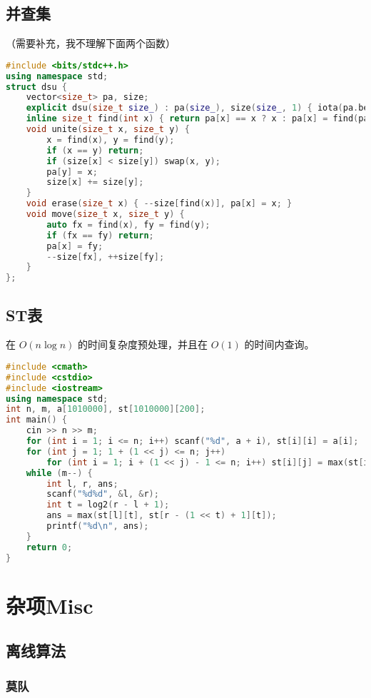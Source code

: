 \documentclass[9pt, a4paper, oneside]{book}
\begin{document}
\section{并查集}
（需要补充，我不理解下面两个函数）
\begin{lstlisting}[language={C++}]
#include <bits/stdc++.h>
using namespace std;
struct dsu {
    vector<size_t> pa, size;
    explicit dsu(size_t size_) : pa(size_), size(size_, 1) { iota(pa.begin(), pa.end(), 0); }
    inline size_t find(int x) { return pa[x] == x ? x : pa[x] = find(pa[x]); }
    void unite(size_t x, size_t y) {
        x = find(x), y = find(y);
        if (x == y) return;
        if (size[x] < size[y]) swap(x, y);
        pa[y] = x;
        size[x] += size[y];
    }
    void erase(size_t x) { --size[find(x)], pa[x] = x; }
    void move(size_t x, size_t y) {
        auto fx = find(x), fy = find(y);
        if (fx == fy) return;
        pa[x] = fy;
        --size[fx], ++size[fy];
    }
};
\end{lstlisting}
\section{ST表}
在 $O(n \log n)$ 的时间复杂度预处理，并且在 $O(1)$ 的时间内查询。
\begin{lstlisting}[language={C++}]
#include <cmath>
#include <cstdio>
#include <iostream>
using namespace std;
int n, m, a[1010000], st[1010000][200];
int main() {
    cin >> n >> m;
    for (int i = 1; i <= n; i++) scanf("%d", a + i), st[i][i] = a[i];
    for (int j = 1; 1 + (1 << j) <= n; j++)
        for (int i = 1; i + (1 << j) - 1 <= n; i++) st[i][j] = max(st[i][j - 1], st[i + (1 << j - 1)][j - 1]);
    while (m--) {
        int l, r, ans;
        scanf("%d%d", &l, &r);
        int t = log2(r - l + 1);
        ans = max(st[l][t], st[r - (1 << t) + 1][t]);
        printf("%d\n", ans);
    }
    return 0;
}\end{lstlisting}
\chapter{杂项Misc}
\section{离线算法}
\subsection{莫队}
\end{document}
